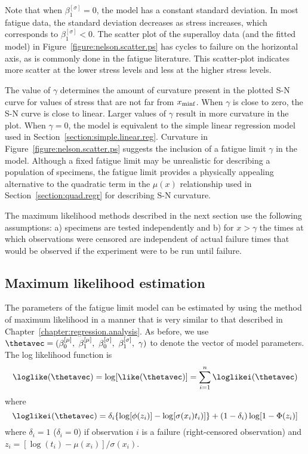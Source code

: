 Note that when $\beta^{[\sigma]}_{1}=0$, the model has a constant
standard deviation.  In most fatigue data, the standard deviation
decreases as stress increases, which corresponds to
$\beta^{[\sigma]}_{1}<0$.  The scatter plot of the superalloy data
(and the fitted model) in Figure~\ref{figure:nelson.scatter.ps} has
cycles to failure on the horizontal axis, as is commonly done in the
fatigue literature. This scatter-plot indicates more scatter at the
lower stress levels and less at the higher stress levels.

The value of $\gamma$ determines the amount of curvature present in
the plotted S-N curve for values of stress that are not far from
$x_{\rm minf}$. When $\gamma$ is close to zero, the S-N curve is close
to linear.  Larger values of $\gamma$ result in more curvature in
the plot.  When $\gamma=0$, the model is equivalent to the simple
linear regression model used in
Section~\ref{section:simple.linear.reg}.  Curvature in
Figure~\ref{figure:nelson.scatter.ps} suggests the inclusion of a
fatigue limit $\gamma$ in the model.  Although a fixed fatigue limit
may be unrealistic for describing a population of specimens, the
fatigue limit provides a physically appealing alternative to the
quadratic term in the $\mu(x)$ relationship used in
Section~\ref{section:quad.regr} for describing S-N curvature.
 
The maximum likelihood methods described in the next section use the
following assumptions: a) specimens are tested independently and b)
for $x > \gamma$ the times at which observations were censored are
independent of actual failure times that would be observed if the
experiment were to be run until failure.

\subsection{Maximum likelihood estimation}
The parameters of the fatigue limit model can be estimated by using
the method of maximum likelihood in a manner that is very similar to
that described in Chapter~\ref{chapter:regression.analysis}.  As
before, we use
$\thetavec=(\beta^{[\mu]}_{0},~\beta^{[\mu]}_{1},~\beta^{[\sigma]}_{0},~\beta^{[\sigma]}_{1},~\gamma)$
to denote the vector of model parameters. The log likelihood
function is
\begin{displaymath}
\loglike(\thetavec)=\log[\like(\thetavec)]=\sum_{i=1}^{n}\loglikei(\thetavec)
\end{displaymath}
where 
\begin{displaymath}
\loglikei(\thetavec)=\delta_{i}\{\log[\phi(z_{i})]-\log[\sigma(x_{i})t_{i})]\}+(1-\delta_{i})\log[1-\Phi(z_{i})]
\end{displaymath}
where $\delta_{i}=1$ ($\delta_{i}=0$) if observation $i$ is a
failure (right-censored observation)
and $z_{i}=[\log(t_{i})-\mu(x_{i})]/\sigma(x_{i})$.
 
